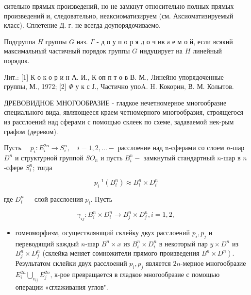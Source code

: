 \documentclass[10pt]{article}
\begin{document}
сительно прямых произведений, но не замкнут относительно полных прямых произведений и, следовательно, неаксиоматизируем (см. Аксиоматизируемый класс). Сплетение Д. г. не всегда доупорядочиваемо.



Подгруппа $H$ группы $G$ наз. $\Gamma$ - д о у п о р я д о ч ив а е м о й, если всякий максимальный частичный порядок группы $G$ индуцирует на $H$ линейный порядок.



Лит.: [1] К о к о р и н А. И., К оп п т о в В. М., Линейно упорядоченные группы, М., 1972; [2] $\Phi$ у к с Ј., Частично упоA. H. Кокорин, В. М. Колытов.



ДРЕВОВИДНОЕ МНОГООБРАЗИЕ - гладкое нечетномерное многообразие специального вида, являющееся краем четномерного многообразия, строящегося из расслоений над сферами с помощью склеек по схеме, задаваемой нек-рым графом (деревом).



Пусть $\quad p_{i}: E_{i}^{2 n} \rightarrow S_{i}^{n}, \quad i=1,2, \ldots-$ расслоение над n-сферами со слоем $n$-шар $D^{n}$ и структурной группой $S O_{n}$ и пусть $B_{i}^{n}-$ замкнутый стандартный $n$-шар в $n$-сфере $S_{i}^{n}$; тогда



\[

p_{i}^{-1}\left(B_{i}^{n}\right) \approx B_{i}^{n} \times D_{i}^{n}

\]



где $D_{i}^{n}-$ слой расслоения $p_{i}$. Пусть



\[

\gamma_{i j}: B_{i}^{n} \times D_{i}^{n} \longrightarrow B_{j}^{n} \times D_{j}^{n}, i=1,2,

\]



\begin{itemize}

  \item гомеоморфизм, осуществляющий склейку двух расслоений $p_{i}, p_{j}$ и переводящий каждый $n$-шар $B^{n} \times x$ из $B_{i}^{n} \times D_{i}^{n}$ в некоторый пар $y \times D^{n}$ из $B_{j}^{n} \times D_{j}^{n}$ (склейка меняет сомножители прямого произведения $\left.B^{n} \times D^{n}\right)$. Результатом склейки двух расслоений $p_{i}, p_{j}$ является $2 n$-мерное многообразие $E_{i}^{2 n} \bigcup_{v_{i j}} E_{j}^{2 n}$, к-рое превращается в гладкое многообразие с помощью операции «сглаживания углов".

\end{itemize}
\end{document}
